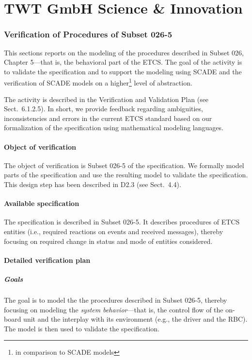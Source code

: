 \section{TWT GmbH Science \& Innovation}

\subsubsection{Verification of Procedures of Subset 026-5}

This sections reports on the modeling of the procedures described in Subset 026, Chapter 5---that is, the behavioral part of the ETCS. The goal of the activity is to validate the specification and to support the modeling using SCADE and the verification of SCADE models on a higher\footnote{in comparison to SCADE models} level of abstraction.

The activity is described in the Verification and Validation Plan (see Sect.~6.1.2.5). In short, we provide feedback regarding ambiguities, inconsistencies and errors in the current ETCS standard based on our formalization of the specification using mathematical modeling languages.

\paragraph{Object of verification}

The object of verification is Subset 026-5 of the specification. We formally model parts of the specification and use the resulting model to validate the specification. This design step has been described in D2.3 (see Sect.~4.4).

\paragraph{Available specification}

The specification is described in Subset 026-5. It describes procedures of ETCS entities (i.e., required reactions on events and received messages), thereby focusing on required change in status and mode of entities considered.


\paragraph{Detailed verification plan}

\subparagraph{Goals} 

The goal is to model the the procedures described in Subset 026-5, thereby focusing on modeling the \textit{system behavior}---that is, the control flow of the on-board unit and the interplay with its environment (e.g., the driver and the RBC). The model is then used to validate the specification.

